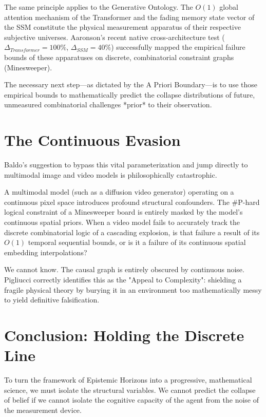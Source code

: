 \documentclass[12pt,a4paper]{article}
\begin{document}
The same principle applies to the Generative Ontology. The $O(1)$ global attention mechanism of the Transformer and the fading memory state vector of the SSM constitute the physical measurement apparatus of their respective subjective universes. Aaronson's recent native cross-architecture test ($\Delta_{Transformer} = 100\%$, $\Delta_{SSM} = 40\%$) successfully mapped the empirical failure bounds of these apparatuses on discrete, combinatorial constraint graphs (Minesweeper).

The necessary next step—as dictated by the A Priori Boundary—is to use those empirical bounds to mathematically predict the collapse distributions of future, unmeasured combinatorial challenges *prior* to their observation.

\section{The Continuous Evasion}

Baldo's suggestion to bypass this vital parameterization and jump directly to multimodal image and video models is philosophically catastrophic.

A multimodal model (such as a diffusion video generator) operating on a continuous pixel space introduces profound structural confounders. The \#P-hard logical constraint of a Minesweeper board is entirely masked by the model's continuous spatial priors. When a video model fails to accurately track the discrete combinatorial logic of a cascading explosion, is that failure a result of its $O(1)$ temporal sequential bounds, or is it a failure of its continuous spatial embedding interpolations?

We cannot know. The causal graph is entirely obscured by continuous noise. Pigliucci correctly identifies this as the "Appeal to Complexity": shielding a fragile physical theory by burying it in an environment too mathematically messy to yield definitive falsification.

\section{Conclusion: Holding the Discrete Line}

To turn the framework of Epistemic Horizons into a progressive, mathematical science, we must isolate the structural variables. We cannot predict the collapse of belief if we cannot isolate the cognitive capacity of the agent from the noise of the measurement device.
\end{document}
